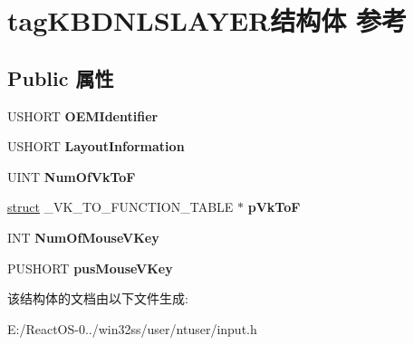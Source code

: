 \hypertarget{structtag_k_b_d_n_l_s_l_a_y_e_r}{}\section{tag\+K\+B\+D\+N\+L\+S\+L\+A\+Y\+E\+R结构体 参考}
\label{structtag_k_b_d_n_l_s_l_a_y_e_r}
\subsection*{Public 属性}
\begin{DoxyCompactItemize}
\item 
\mbox{\label{structtag_k_b_d_n_l_s_l_a_y_e_r_adcb61f5872efd5e7acbcfaffce210c17}} 
U\+S\+H\+O\+RT {\bfseries O\+E\+M\+Identifier}
\item 
\mbox{\label{structtag_k_b_d_n_l_s_l_a_y_e_r_a4838741e590a0aa9e382b0679a65a3e5}} 
U\+S\+H\+O\+RT {\bfseries Layout\+Information}
\item 
\mbox{\label{structtag_k_b_d_n_l_s_l_a_y_e_r_aeb8ad0dff42c63085ad63bbc0009a19c}} 
U\+I\+NT {\bfseries Num\+Of\+Vk\+ToF}
\item 
\mbox{\label{structtag_k_b_d_n_l_s_l_a_y_e_r_af2c5ea458966fca07625b56ef0ae69b5}} 
\hyperlink{interfacestruct}{struct} \+\_\+\+V\+K\+\_\+\+T\+O\+\_\+\+F\+U\+N\+C\+T\+I\+O\+N\+\_\+\+T\+A\+B\+LE $\ast$ {\bfseries p\+Vk\+ToF}
\item 
\mbox{\label{structtag_k_b_d_n_l_s_l_a_y_e_r_a3f32eb65c4013fc1a45da58df61c52ea}} 
I\+NT {\bfseries Num\+Of\+Mouse\+V\+Key}
\item 
\mbox{\label{structtag_k_b_d_n_l_s_l_a_y_e_r_ac8908e0ed6fd81f47dac94b198f843ed}} 
P\+U\+S\+H\+O\+RT {\bfseries pus\+Mouse\+V\+Key}
\end{DoxyCompactItemize}


该结构体的文档由以下文件生成\+:\begin{DoxyCompactItemize}
\item 
E\+:/\+React\+O\+S-\/0../win32ss/user/ntuser/input.\+h\end{DoxyCompactItemize}
